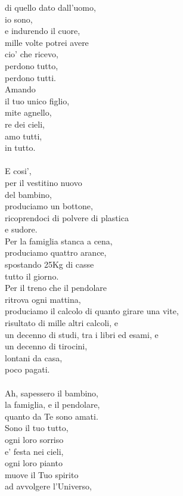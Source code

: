 \begin{haiku}
di quello dato dall'uomo,\\
io sono,\\
e indurendo il cuore,\\
mille volte potrei avere\\
cio' che ricevo,\\
perdono tutto,\\
perdono tutti.\\
Amando \\
il tuo unico figlio,\\
mite agnello,\\
re dei cieli,\\
amo tutti,\\
in tutto.\\
\leavevmode\\
E cosi',\\
per il vestitino nuovo\\
del bambino,\\
produciamo un bottone,\\
ricoprendoci di polvere di plastica\\
e sudore.\\
Per la famiglia stanca a cena,\\
produciamo quattro arance,\\
spostando 25Kg di casse\\
tutto il giorno.\\
Per il treno che il pendolare \\
ritrova ogni mattina,\\
produciamo il calcolo di quanto girare una vite,\\
risultato di mille altri calcoli, e\\
un decenno di studi, tra i libri ed esami, e\\
un decenno di tirocini,\\
lontani da casa,\\
poco pagati.\\
\leavevmode\\
Ah, sapessero il bambino,\\
la famiglia, e il pendolare,\\
quanto da Te sono amati.\\
Sono il tuo tutto,\\
ogni loro sorriso\\
e' festa nei cieli,\\
ogni loro pianto\\
muove il Tuo spirito\\
ad avvolgere l'Universo,\\

\end{haiku}
